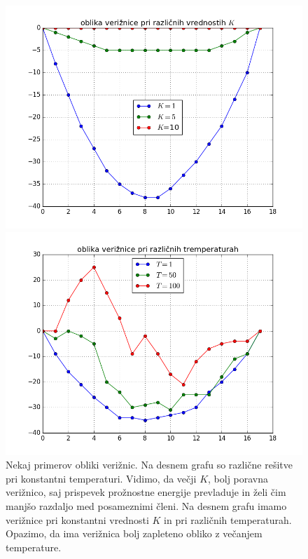 \documentclass[slovene,11pt,a4paper]{article}
\numberwithin{equation}{section} %
\numberwithin{figure}{section} %
\numberwithin{table}{section} %
\begin{document}
\begin{figure}[!h]
\centering
\begin{minipage}{0.5\textwidth}
\centering
\includegraphics[scale=0.35]{slike/veriznica_temp_1.png}
\end{minipage}\hfill
\begin{minipage}{0.5\textwidth}
\centering
\includegraphics[scale=0.35]{slike/veriznica_k_1.png}
\end{minipage}

\caption{Nekaj primerov obliki verižnic. Na desnem grafu so različne rešitve pri konstantni temperaturi. Vidimo, da večji $K$, bolj poravna verižnico, saj prispevek prožnostne energije prevladuje in želi čim manjšo razdaljo med posameznimi členi. Na desnem grafu imamo verižnice pri konstantni vrednosti $K$ in pri različnih temperaturah. Opazimo, da ima verižnica bolj zapleteno obliko z večanjem temperature.}
\end{figure}
\end{document}
